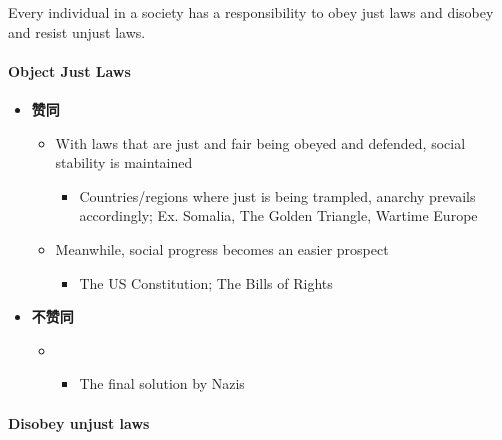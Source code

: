 \documentclass{article}
\begin{document}
  Every individual in a society has a responsibility to obey just laws
  and disobey and resist unjust laws.

  \paragraph{Object Just Laws}

  \begin{itemize}
    \item \textbf{赞同}
    \begin{itemize}
      \item With laws that are just and fair being obeyed and defended,
      social stability is maintained
      \begin{itemize}
        \item Countries/regions where just is being trampled, anarchy
        prevails accordingly; Ex. Somalia, The Golden Triangle,
        Wartime Europe
      \end{itemize}

      \item Meanwhile, social progress becomes an easier prospect
      \begin{itemize}
        \item The US Constitution; The Bills of Rights
      \end{itemize}
    \end{itemize}

    \item \textbf{不赞同}
    \begin{itemize}
      \item {}
      \begin{itemize}
        \item The final solution by Nazis
      \end{itemize}
    \end{itemize}
  \end{itemize}

  \paragraph{Disobey unjust laws}
\end{document}
